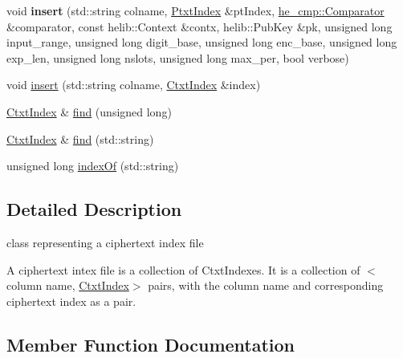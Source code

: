 \begin{DoxyCompactItemize}
\item 
\mbox{\label{classHDB__supergate___1_1CtxtIndexFile_af5316d579090faa7872b4f00b5b55bdf}} 
void {\bfseries insert} (std\+::string colname, \hyperlink{classHDB__supergate___1_1PtxtIndex}{Ptxt\+Index} \&pt\+Index, \hyperlink{classhe__cmp_1_1Comparator}{he\+\_\+cmp\+::\+Comparator} \&comparator, const helib\+::\+Context \&contx, helib\+::\+Pub\+Key \&pk, unsigned long input\+\_\+range, unsigned long digit\+\_\+base, unsigned long enc\+\_\+base, unsigned long exp\+\_\+len, unsigned long nslots, unsigned long max\+\_\+per, bool verbose)
\item 
void \hyperlink{classHDB__supergate___1_1CtxtIndexFile_ab581d8e3c893b29a80b18413b1c45412}{insert} (std\+::string colname, \hyperlink{classHDB__supergate___1_1CtxtIndex}{Ctxt\+Index} \&index)
\item 
\hyperlink{classHDB__supergate___1_1CtxtIndex}{Ctxt\+Index} \& \hyperlink{classHDB__supergate___1_1CtxtIndexFile_a22e64dc85f8e2ec050ee00820d31d083}{find} (unsigned long)
\item 
\hyperlink{classHDB__supergate___1_1CtxtIndex}{Ctxt\+Index} \& \hyperlink{classHDB__supergate___1_1CtxtIndexFile_aa579ec2799b316a65f426356ca76efd8}{find} (std\+::string)
\item 
unsigned long \hyperlink{classHDB__supergate___1_1CtxtIndexFile_abbc89b8e64ca3bcfe104c2371336bd9f}{index\+Of} (std\+::string)
\end{DoxyCompactItemize}


\subsection{Detailed Description}
class representing a ciphertext index file 

A ciphertext intex file is a collection of Ctxt\+Indexes. It is a collection of $<$column name, \hyperlink{classHDB__supergate___1_1CtxtIndex}{Ctxt\+Index}$>$ pairs, with the column name and corresponding ciphertext index as a pair. 

\subsection{Member Function Documentation}
\mbox{\label{classHDB__supergate___1_1CtxtIndexFile_a52792f06177d60f6580a664f24b706ee}} 
